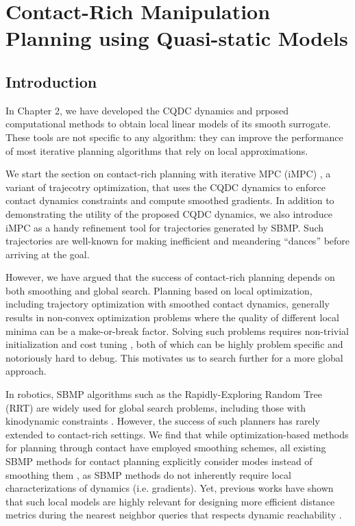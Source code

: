 \chapter{Contact-Rich Manipulation Planning using Quasi-static Models} \label{chapter:contact_rich_planning}
\section{Introduction}
In Chapter 2, we have developed the CQDC dynamics and prposed computational methods to obtain local linear models of its smooth surrogate. These tools are not specific to any algorithm: they can improve the performance of most iterative planning algorithms that rely on local approximations. 

We start the section on contact-rich planning with iterative MPC (iMPC) \cite{bundledgradients}, a variant of trajecotry optimization, that uses the CQDC dynamics to enforce contact dynamics constraints and compute smoothed gradients. In addition to demonstrating the utility of the proposed CQDC dynamics, we also introduce iMPC as a handy refinement tool for trajectories generated by SBMP. Such trajectories are well-known for making inefficient and meandering ``dances'' before arriving at the goal. 

However, we have argued that the success of contact-rich planning depends on both smoothing and global search. Planning based on local optimization, including trajectory optimization with smoothed contact dynamics, generally results in non-convex optimization problems where the quality of different local minima can be a make-or-break factor. Solving such problems requires non-trivial initialization and cost tuning \cite{onol2020tuning}, both of which can be highly problem specific and notoriously hard to debug. This motivates us to search further for a more global approach.

In robotics, SBMP algorithms such as the Rapidly-Exploring Random Tree (RRT) \cite{lavalle1998rapidly} are widely used for global search problems, including those with kinodynamic constraints \cite{karaman2010optimal}. However, the success of such planners has rarely extended to contact-rich settings. We find that while optimization-based methods for planning through contact have employed smoothing schemes, all existing SBMP methods for contact planning explicitly consider modes instead of smoothing them \cite{cheng2021contact,wu2020r3t,chen2021trajectotree,motioncones,terry}, as SBMP methods do not inherently require local characterizations of dynamics (i.e. gradients). Yet, previous works have shown that such local models are highly relevant for designing more efficient distance metrics during the nearest neighbor queries that respects dynamic reachability \cite{shkolnik2009reachability,wu2020r3t,haddad2021anytime}.

